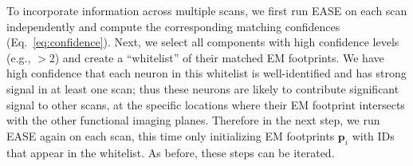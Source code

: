 \documentclass[10pt,letterpaper]{article}
\begin{document}
{%



To incorporate information across multiple scans, we first run EASE on each scan independently and compute the corresponding matching confidences (Eq.~\ref{eq:confidence}).
Next, we select all components with high confidence levels (e.g., $>2$) and create a ``whitelist'' of their matched EM footprints. 
We have high confidence that each neuron in this whitelist is well-identified and has strong signal in at least one scan; thus these neurons are likely to contribute significant signal to other scans, at the specific locations where their EM footprint intersects with the other functional imaging planes. Therefore in the next step, we run EASE again on each scan, this time only initializing EM footprints $\bm{p}_i$ with IDs that appear in the whitelist.  As before, these steps can be iterated. 



}
\end{document}
